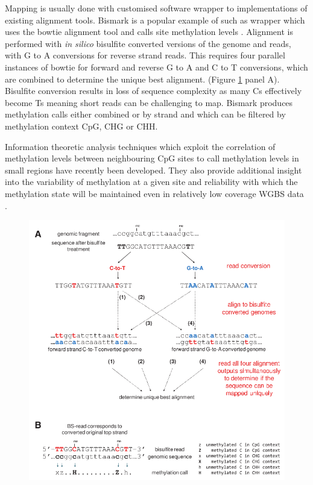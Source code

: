 \documentclass[]{book}
\begin{document}
Mapping is usually done with customised software wrapper to implementations of existing alignment tools. Bismark is a popular example of such as wrapper which uses the bowtie alignment tool and calls site methylation levels \citep{Tran2014}. Alignment is performed with \emph{in silico} bisulfite converted versions of the genome and reads, with G to A conversions for reverse strand reads. This requires four parallel instances of bowtie for forward and reverse G to A and C to T conversions, which are combined to determine the unique best alignment. (Figure \ref{fig:Krueger2011BismarkAlignment} panel A). Bisulfite conversion results in loss of sequence complexity as many Cs effectively become Ts meaning short reads can be challenging to map. Bismark produces methylation calls either combined or by strand and which can be filtered by methylation context CpG, CHG or CHH.

Information theoretic analysis techniques which exploit the correlation of methylation levels between neighbouring CpG sites \citep[\citet{Affinito2016}]{Haerter2014} to call methylation levels in small regions have recently been developed. They also provide additional insight into the variability of methylation at a given site and reliability with which the methylation state will be maintained even in relatively low coverage WGBS data \citep{Jenkinson2018}.

\begin{figure}

{\centering \includegraphics[width=0.9\linewidth]{figs/Krueger2011BismarkAlignment} 

}

\caption{\citep{Krueger2011}}\label{fig:Krueger2011BismarkAlignment}
\end{figure}
\end{document}
